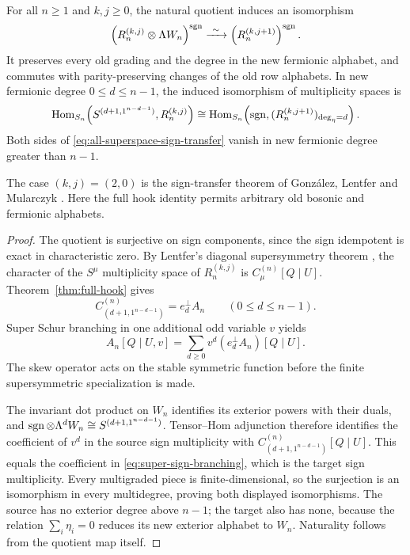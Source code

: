 \begin{theorem}
\label{thm:all-superspace-sign-transfer}
For all $n\geq1$ and $k,j\geq0$, the natural quotient induces an
isomorphism
\begin{equation}\label{eq:all-superspace-sign-transfer}
 \left(R_n^{(k,j)}\otimes\Lambda W_n\right)^{\operatorname{sgn}}
 \xrightarrow{\ \sim\ }
 \left(R_n^{(k,j+1)}\right)^{\operatorname{sgn}}.
\end{equation}
It preserves every old grading and the degree in the new fermionic
alphabet, and commutes with parity-preserving changes of the old
row alphabets.  In new fermionic degree $0\leq d\leq n-1$, the
induced isomorphism of multiplicity spaces is
\begin{equation}\label{eq:super-hook-multiplicity}
 \operatorname{Hom}_{S_n}\!\left(S^{(d+1,1^{n-d-1})},R_n^{(k,j)}\right)
 \cong
 \operatorname{Hom}_{S_n}\!\left(\operatorname{sgn},
       (R_n^{(k,j+1)})_{\deg_\eta=d}\right).
\end{equation}
Both sides of \eqref{eq:all-superspace-sign-transfer} vanish in
new fermionic degree greater than $n-1$.
\end{theorem}

The case $(k,j)=(2,0)$ is the sign-transfer theorem of
Gonz\'alez, Lentfer and Mularczyk \cite[Theorem~4.21]{GLM}.
Here the full hook identity permits arbitrary old bosonic and
fermionic alphabets.

\begin{proof}
The quotient is surjective on sign components, since the sign
idempotent is exact in characteristic zero.  By Lentfer's diagonal
supersymmetry theorem \cite[Theorem~1.2 and Corollary~1.3]{Lentfer},
the character of the $S^\mu$ multiplicity space of $R_n^{(k,j)}$ is
$C_\mu^{(n)}[Q\mid U]$.  Theorem~\ref{thm:full-hook} gives
\[
 C_{(d+1,1^{n-d-1})}^{(n)}=e_d^\perp A_n
 \qquad(0\leq d\leq n-1).
\]
Super Schur branching in one additional odd variable $v$ yields
\begin{equation}\label{eq:super-sign-branching}
 A_n[Q\mid U,v]
   =\sum_{d\geq0}v^d(e_d^\perp A_n)[Q\mid U].
\end{equation}
The skew operator acts on the stable symmetric function before
the finite supersymmetric specialization is made.

The invariant dot product on $W_n$ identifies its exterior powers
with their duals, and
$\operatorname{sgn}\otimes\Lambda^dW_n\cong S^{(d+1,1^{n-d-1})}$.
Tensor--Hom adjunction therefore identifies the coefficient of
$v^d$ in the source sign multiplicity with
$C_{(d+1,1^{n-d-1})}^{(n)}[Q\mid U]$.
This equals the coefficient in \eqref{eq:super-sign-branching},
which is the target sign multiplicity.  Every multigraded piece is
finite-dimensional, so the surjection is an isomorphism in every
multidegree, proving both displayed isomorphisms.  The source has
no exterior degree above $n-1$; the target also has none, because
the relation $\sum_i\eta_i=0$ reduces its new exterior alphabet to
$W_n$.  Naturality follows from the quotient map itself.
\end{proof}

